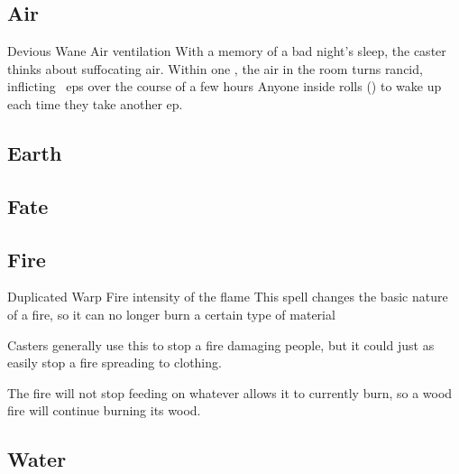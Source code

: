 \begin{multicols}{2}

\subsection{Air}

  {Devious}%
  {Wane}%
  {Air}%
  {ventilation}%
  {With a memory of a bad night's sleep, the caster thinks about suffocating air.
  Within one \showOnset, the air in the room turns rancid, inflicting ~\glspl{ep} over the course of a few hours}%
  {Anyone inside rolls  (\tn[10]) to wake up each time they take another \gls{ep}.}



\subsection{Earth}



\subsection{Fate}


\subsection{Fire}


  {Duplicated}%
  {Warp}%
  {Fire}%
  {intensity of the flame}%
  {This spell changes the basic nature of a fire, so it can no longer burn a certain type of material}%
  {Casters generally use this to stop a fire damaging people, but it could just as easily stop a fire spreading to clothing.

    The fire will not stop feeding on whatever allows it to currently burn, so a wood fire will continue burning its wood.}

\subsection{Water}



\end{multicols}
